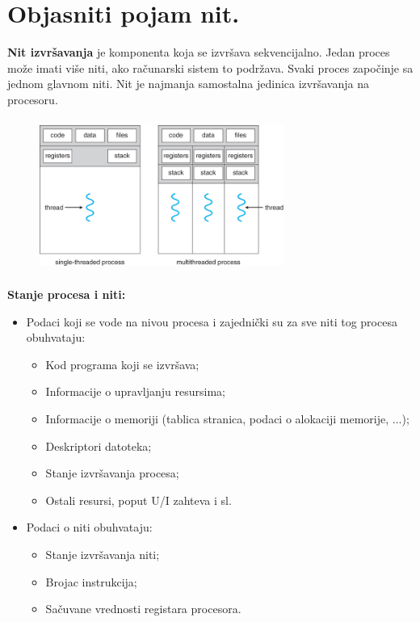 \documentclass[a4paper]{article}
\begin{document}
\section{Objasniti pojam nit.}
  \textbf{Nit izvršavanja} je komponenta koja se izvršava sekvencijalno. Jedan proces može imati više 
  niti, ako računarski sistem to podržava. Svaki proces započinje sa jednom glavnom niti.
  Nit je najmanja samostalna jedinica izvršavanja na procesoru.

  \begin{figure}[H]
    \begin{center}
        \includegraphics[width=80mm,height=50mm]{Slike/proces_niti.jpg}
    \end{center}
  \end{figure}

  \textbf{Stanje procesa i niti:}
  \begin{itemize}
    \item Podaci koji se vode na nivou procesa i zajednički su za sve niti tog procesa obuhvataju:
      \begin{itemize}
        \item Kod programa koji se izvršava;
        \item Informacije o upravljanju resursima;
        \item Informacije o memoriji (tablica stranica, podaci o alokaciji memorije, ...);
        \item Deskriptori datoteka;
        \item Stanje izvršavanja procesa;
        \item Ostali resursi, poput U/I zahteva i sl.
      \end{itemize}
    \item Podaci o niti obuhvataju:
      \begin{itemize}
        \item Stanje izvršavanja niti;
        \item Brojac instrukcija;
        \item Sačuvane vrednosti registara procesora.
      \end{itemize}
  \end{itemize}
\end{document}
